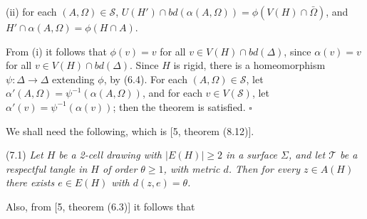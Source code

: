 \hspace*{12pt}(ii) for each $(A, \Omega) \in \mathscr{S}$, $U(H') \cap bd(\alpha(A, \Omega)) = \phi(V(H) \cap \bar{\Omega})$, and $H' \cap \alpha(A, \Omega) = \phi(H \cap A)$.

From (i) it follows that $\phi(v) = v$ for all $v \in V(H) \cap bd(\Delta)$, since $\alpha(v) = v$ for all $v \in V(H) \cap bd(\Delta)$. Since $H$ is rigid, there is a homeomorphism $\psi : \Delta \to \Delta$ extending $\phi$, by (6.4). For each $(A, \Omega) \in \mathscr{S}$, let $\alpha'(A, \Omega) = \psi^{-1}(\alpha(A, \Omega))$, and for each $v \in V(\mathscr{S})$, let $\alpha'(v) = \psi^{-1}(\alpha(v))$; then the theorem is satisfied. $\square$


We shall need the following, which is [5, theorem (8.12)].

\stmt
(7.1) \textit{Let $H$ be a 2-cell drawing with $|E(H)| \ge 2$ in a surface $\Sigma$, and let $\mathscr{T}$ be a respectful tangle in $H$ of order $\theta \ge 1$, with metric $d$. Then for every $z \in A(H)$ there exists $e \in E(H)$ with $d(z, e) = \theta$.}

Also, from [5, theorem (6.3)] it follows that

